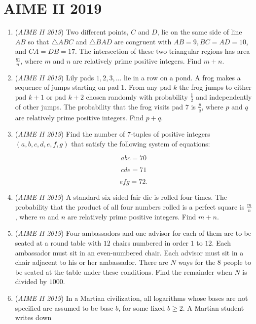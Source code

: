 \section{AIME II 2019}
        \begin{enumerate}
        	\item (\textit{AIME II 2019}) Two different points, $C$ and $D$, lie on the same side of line $AB$ so that $\triangle ABC$ and $\triangle BAD$ are congruent with $AB=9,BC=AD=10$, and $CA=DB=17$. The intersection of these two triangular regions has area $\frac{m}{n}$, where $m$ and $n$ are relatively prime positive integers. Find $m+n$.


 

	\item (\textit{AIME II 2019}) Lily pads $1,2,3,\ldots$ lie in a row on a pond. A frog makes a sequence of jumps starting on pad $1$. From any pad $k$ the frog jumps to either pad $k+1$ or pad $k+2$ chosen randomly with probability $\frac{1}{2}$ and independently of other jumps. The probability that the frog visits pad $7$ is $\frac{p}{q}$, where $p$ and $q$ are relatively prime positive integers. Find $p+q$.


 

	\item (\textit{AIME II 2019}) Find the number of $7$-tuples of positive integers $(a,b,c,d,e,f,g)$ that satisfy the following system of equations: 

 \[abc=70\]

 \[cde=71\]

 \[efg=72.\]


	\item (\textit{AIME II 2019}) A standard six-sided fair die is rolled four times. The probability that the product of all four numbers rolled is a perfect square is $\frac{m}{n}$, where $m$ and $n$ are relatively prime positive integers. Find $m+n$.


 

	\item (\textit{AIME II 2019}) Four ambassadors and one advisor for each of them are to be seated at a round table with $12$ chairs numbered in order $1$ to $12$. Each ambassador must sit in an even-numbered chair. Each advisor must sit in a chair adjacent to his or her ambassador. There are $N$ ways for the $8$ people to be seated at the table under these conditions. Find the remainder when $N$ is divided by $1000$.


 

	\item (\textit{AIME II 2019}) In a Martian civilization, all logarithms whose bases are not specified are assumed to be base $b$, for some fixed $b\ge2$. A Martian student writes down


\end{enumerate}
